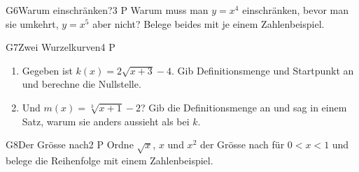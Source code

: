 \documentclass[11pt]{article}
\begin{document}
\begin{lpaufgabe}{G6}{Warum einschränken?}{3 P}
Warum muss man $y = x^{4}$ einschränken, bevor man sie umkehrt, $y = x^{5}$ aber nicht?
Belege beides mit je einem Zahlenbeispiel.
\end{lpaufgabe}


\begin{lpaufgabe}{G7}{Zwei Wurzelkurven}{4 P}
\begin{enumerate}[label=(\alph*),leftmargin=*,itemsep=1pt]
\item Gegeben ist $k(x) = 2\sqrt{x+3} - 4$. Gib Definitionsmenge und Startpunkt an und berechne die Nullstelle.
\item Und $m(x) = \sqrt[3]{x+1} - 2$? Gib die Definitionsmenge an und sag in einem Satz, warum sie anders aussieht als bei $k$.
\end{enumerate}
\end{lpaufgabe}

\begin{lpaufgabe}{G8}{Der Grösse nach}{2 P}
Ordne $\sqrt{x}$, $x$ und $x^{2}$ der Grösse nach für $0 < x < 1$ und belege die Reihenfolge mit einem Zahlenbeispiel.
\end{lpaufgabe}
\end{document}
